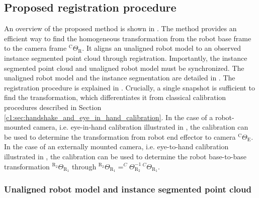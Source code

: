 \subsection{Proposed registration procedure}
\label{c1:sec:proposed_calibration_procedure}
An overview of the proposed method is shown in . The method provides an efficient way to find the homogeneous transformation from the robot base frame to the camera frame $^\text{C}\Theta_\text{R}$. It aligns an unaligned robot model to an observed instance segmented point cloud through registration. Importantly, the instance segmented point cloud and unaligned robot model must be synchronized. The unaligned robot model and the instance segmentation are detailed in . The registration procedure is explained in . Crucially, a single snapshot is sufficient to find the transformation, which differentiates it from classical calibration procedures described in Section \ref{c1:sec:handshake_and_eye_in_hand_calibration}. In the case of a robot-mounted camera, i.e. eye-in-hand calibration illustrated in , the calibration can be used to determine the transformation from robot end effector to camera $^\text{C}\Theta_\text{E}$. In the case of an externally mounted camera, i.e. eye-to-hand calibration illustrated in , the calibration can be used to determine the robot base-to-base transformation $^{\text{R}_2}\Theta_{\text{R}_1}$ through $^{\text{R}_2}\Theta_{\text{R}_1} = ^C\Theta^{-1}_{\text{R}_2}\,^{C}\Theta_{\text{R}_1}$.

\subsubsection{Unaligned robot model and instance segmented point cloud}
\label{c1:sec:unaligned_robot_model_and_instance_segmented_point_cloud}

